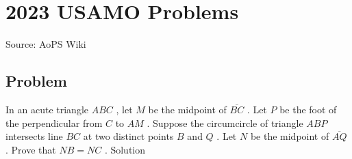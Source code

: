\documentclass[12pt]{article}
\begin{document}
\section*{{2023 USAMO Problems}}
Source: AoPS Wiki

\subsection*{Problem}
In an acute triangle $ABC$ , let $M$ be the midpoint of $\overline{BC}$ . Let $P$ be the foot of the perpendicular from $C$ to $AM$ . Suppose the circumcircle of triangle $ABP$ intersects line $BC$ at two distinct points $B$ and $Q$ . Let $N$ be the midpoint of $\overline{AQ}$ . Prove that $NB=NC$ . Solution
\end{document}
